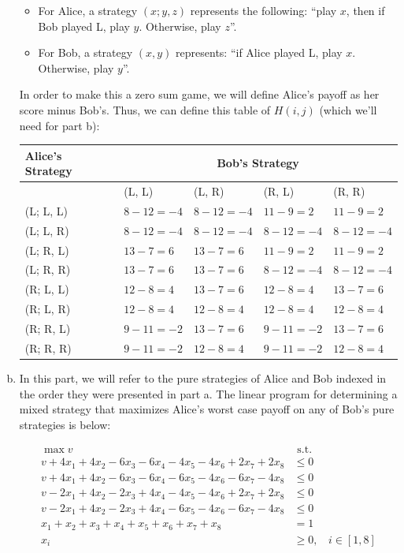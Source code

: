 \documentclass[fleqn]{homework}
\begin{document}
\begin{problem}{2}
\begin{enumerate}[a.]
      \begin{itemize}
      \item For Alice, a strategy $(x; y, z)$ represents the following: ``play
        $x$, then if Bob played L, play $y$.  Otherwise, play $z$''.
      \item For Bob, a strategy $(x, y)$ represents: ``if Alice played L, play
        $x$.  Otherwise, play $y$''.
      \end{itemize}

      In order to make this a zero sum game, we will define Alice's payoff as
      her score minus Bob's.  Thus, we can define this table of $H(i,j)$ (which
      we'll need for part b):

      \begin{tabular}{lllll}
        \toprule
        Alice's Strategy & \multicolumn{4}{c}{Bob's Strategy} \\
        \midrule
        & (L, L) & (L, R) & (R, L) & (R, R) \\
        (L; L, L) & $8-12=-4$ & $8-12=-4$ & $11-9=2$  & $11-9=2$  \\
        (L; L, R) & $8-12=-4$ & $8-12=-4$ & $8-12=-4$ & $8-12=-4$ \\
        (L; R, L) & $13-7=6$  & $13-7=6$  & $11-9=2$  & $11-9=2$  \\
        (L; R, R) & $13-7=6$  & $13-7=6$  & $8-12=-4$ & $8-12=-4$ \\
        (R; L, L) & $12-8=4$  & $13-7=6$  & $12-8=4$  & $13-7=6$  \\
        (R; L, R) & $12-8=4$  & $12-8=4$  & $12-8=4$  & $12-8=4$  \\
        (R; R, L) & $9-11=-2$ & $13-7=6$  & $9-11=-2$ & $13-7=6$  \\
        (R; R, R) & $9-11=-2$ & $12-8=4$  & $9-11=-2$ & $12-8=4$  \\
        \bottomrule
      \end{tabular}

    \item In this part, we will refer to the pure strategies of Alice and Bob
      indexed in the order they were presented in part a.  The linear program
      for determining a mixed strategy that maximizes Alice's worst case payoff
      on any of Bob's pure strategies is below:

      \begin{align*}
        \max v &\text{ s.t.} \\
        v + 4x_1 + 4x_2 - 6x_3 - 6x_4 - 4x_5 - 4x_6 + 2x_7 + 2x_8 &\le 0 \\
        v + 4x_1 + 4x_2 - 6x_3 - 6x_4 - 6x_5 - 4x_6 - 6x_7 - 4x_8 &\le 0 \\
        v - 2x_1 + 4x_2 - 2x_3 + 4x_4 - 4x_5 - 4x_6 + 2x_7 + 2x_8 &\le 0 \\
        v - 2x_1 + 4x_2 - 2x_3 + 4x_4 - 6x_5 - 4x_6 - 6x_7 - 4x_8 &\le 0 \\
        x_1 + x_2 + x_3 + x_4 + x_5 + x_6 + x_7 + x_8 &= 1 \\
        x_i &\ge 0, \:\:\:\: i \in [1, 8] \\
      \end{align*}


\end{enumerate}
\end{problem}
\end{document}
